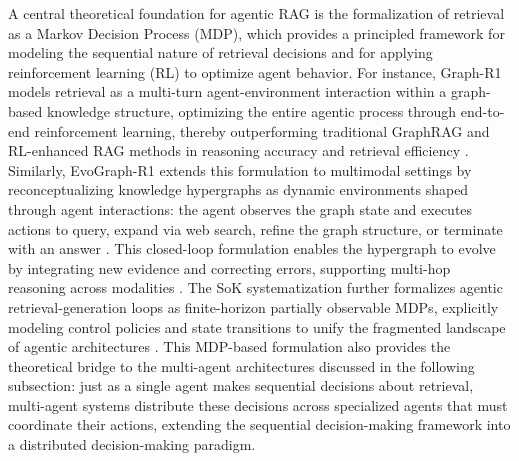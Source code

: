 \documentclass[11pt]{article}
\begin{document}
A central theoretical foundation for agentic RAG is the formalization of retrieval as a Markov Decision Process (MDP), which provides a principled framework for modeling the sequential nature of retrieval decisions and for applying reinforcement learning (RL) to optimize agent behavior. For instance, Graph-R1 models retrieval as a multi-turn agent-environment interaction within a graph-based knowledge structure, optimizing the entire agentic process through end-to-end reinforcement learning, thereby outperforming traditional GraphRAG and RL-enhanced RAG methods in reasoning accuracy and retrieval efficiency \cite{ref306}. Similarly, EvoGraph-R1 extends this formulation to multimodal settings by reconceptualizing knowledge hypergraphs as dynamic environments shaped through agent interactions: the agent observes the graph state and executes actions to query, expand via web search, refine the graph structure, or terminate with an answer \cite{ref42}. This closed-loop formulation enables the hypergraph to evolve by integrating new evidence and correcting errors, supporting multi-hop reasoning across modalities \cite{ref42}. The SoK systematization further formalizes agentic retrieval-generation loops as finite-horizon partially observable MDPs, explicitly modeling control policies and state transitions to unify the fragmented landscape of agentic architectures \cite{ref25}. This MDP-based formulation also provides the theoretical bridge to the multi-agent architectures discussed in the following subsection: just as a single agent makes sequential decisions about retrieval, multi-agent systems distribute these decisions across specialized agents that must coordinate their actions, extending the sequential decision-making framework into a distributed decision-making paradigm.
\end{document}
